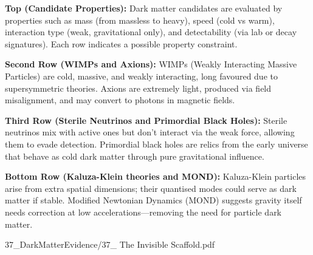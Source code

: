 \begin{SideNotePage}{
  \textbf{Top (Candidate Properties):}  
  Dark matter candidates are evaluated by properties such as mass (from massless to heavy), speed (cold vs warm), interaction type (weak, gravitational only), and detectability (via lab or decay signatures). Each row indicates a possible property constraint. \par

  \textbf{Second Row (WIMPs and Axions):}  
  WIMPs (Weakly Interacting Massive Particles) are cold, massive, and weakly interacting, long favoured due to supersymmetric theories. Axions are extremely light, produced via field misalignment, and may convert to photons in magnetic fields. \par

  \textbf{Third Row (Sterile Neutrinos and Primordial Black Holes):}  
  Sterile neutrinos mix with active ones but don’t interact via the weak force, allowing them to evade detection. Primordial black holes are relics from the early universe that behave as cold dark matter through pure gravitational influence. \par

  \textbf{Bottom Row (Kaluza-Klein theories and MOND):}  
  Kaluza-Klein particles arise from extra spatial dimensions; their quantised modes could serve as dark matter if stable. Modified Newtonian Dynamics (MOND) suggests gravity itself needs correction at low accelerations—removing the need for particle dark matter. \par

}{37_DarkMatterEvidence/37_ The Invisible Scaffold.pdf}
\end{SideNotePage}
